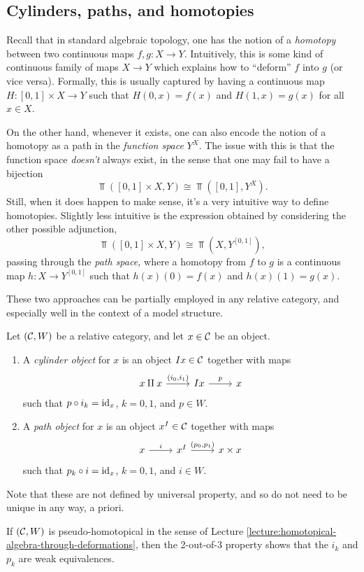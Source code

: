 \subsection{Cylinders, paths, and homotopies}
Recall that in standard algebraic topology, one has the notion of a \emph{homotopy} between two continuous maps \(f,g\!:X\to Y\). Intuitively,
this is some kind of continuous family of maps \(X\to Y\) which explains how to ``deform'' \(f\) into \(g\) (or vice versa). Formally, this is usually captured by
having a continuous map \(H\!:[0,1]\times X\to Y\) such that \(H(0,x) = f(x)\) and \(H(1,x) = g(x)\) for all \(x\in X\).

On the other hand, whenever it exists, one can also encode the notion of a homotopy as a path in the \emph{function space} \(Y^X\). The issue with this is that
the function space \emph{doesn't} always exist, in the sense that one may fail to have a bijection
\[ \Top([0,1]\times X, Y) \cong \Top([0,1],Y^X). \]
Still, when it does happen to make sense, it's a very intuitive way to define homotopies. Slightly less intuitive is the expression obtained by considering
the other possible adjunction,
\[ \Top([0,1]\times X, Y) \cong \Top(X,Y^{[0,1]}), \]
passing through the \emph{path space,} where a homotopy from \(f\) to \(g\) is a continuous map \(h\!:X\to Y^{[0,1]}\) such that \(h(x)(0) = f(x)\) and \(h(x)(1) = g(x)\).

These two approaches can be partially employed in any relative category, and especially well in the context of a model structure.
\begin{definition}
	Let \((\mathcal{C},W)\) be a relative category, and let \(x\in \mathcal{C}\) be an object.
	\begin{enumerate}[label=(\roman*)]
		\item A \emph{cylinder object} for \(x\) is an object \(Ix\in\mathcal{C}\) together with maps
		\[
			\begin{tikzcd}
				x\amalg x \ar[r,"{ (i_0, i_1) }"] & Ix \ar[r,"p"] & x
			\end{tikzcd}
		\]
		such that \(p\circ i_k = \mathrm{id}_x\), \(k=0,1\), and \(p\in W\).
		\item A \emph{path object} for \(x\) is an object \(x^I\in\mathcal{C}\) together with maps
		\[
			\begin{tikzcd}
				x\ar[r,"i"] & x^I \ar[r,"{ (p_0,p_1) }"] & x\times x
			\end{tikzcd}
		\]
		such that \(p_k\circ i = \mathrm{id}_x\), \(k=0,1\), and \(i\in W\).
	\end{enumerate}
\end{definition}
\begin{remark}
	Note that these are not defined by universal property, and so do not need to be unique in any way, a priori.
\end{remark}
\begin{remark}
	If \((\mathcal{C},W)\) is pseudo-homotopical in the sense of Lecture \ref{lecture:homotopical-algebra-through-deformations}, then the 2-out-of-3 property
	shows that the \(i_k\) and \(p_k\) are weak equivalences.
\end{remark}


